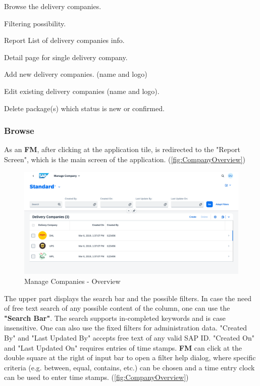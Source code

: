 \begin{compactenum}
	\item Browse the delivery companies.
        \begin{compactenum}
            \item Filtering possibility.
            \item Report List of delivery companies info.
            \item Detail page for single delivery company.
        \end{compactenum}
    \item Add new delivery companies. (name and logo)
    \item Edit existing delivery companies (name and logo).
    \item Delete package(s) which status is new or confirmed.
\end{compactenum}

\subsubsection{Browse}
As an \textbf{FM}, after clicking at the application tile, is redirected to the "Report Screen", which is the main screen of the application. (\autoref{fig:CompanyOverview})

\begin{figure}[H]
	\centering
	\includegraphics[width=1\linewidth]{images/user_doc/company/report/overview.png}
	\caption{Manage Companies - Overview}
	\label{fig:CompanyOverview}
\end{figure}

The upper part displays the search bar and the possible filters. 
In case the need of free text search of any possible content of the column, one can use the \textbf{"Search Bar"}. The search supports in-completed keywords and is case insensitive. One can also use the fixed filters for administration data. "Created By" and "Last Updated By" accepts free text of any valid SAP ID. "Created On" and "Last Updated On" requires entries of time stamps. \textbf{FM} can click at the double square at the right of input bar to open a filter help dialog, where specific criteria (e.g. between, equal, contains, etc.) can be chosen and a time entry clock can be used to enter time stamps. (\autoref{fig:CompanyOverview})

